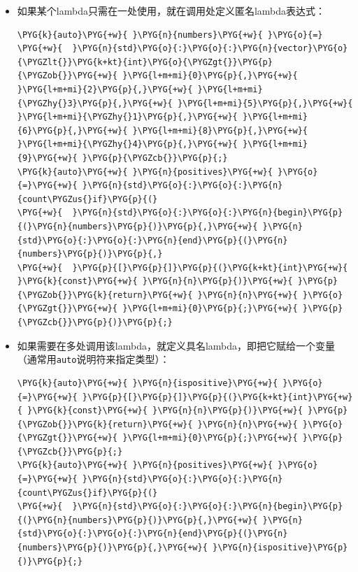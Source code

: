 \begin{itemize}
\item 如果某个lambda只需在一处使用，就在调用处定义匿名lambda表达式：



\begin{codeblockbg}
\begin{Verbatim}[commandchars=\\\{\},breaklines=true,breakanywhere=true,fontsize=\codefont,xleftmargin=17bp]
\PYG{k}{auto}\PYG{+w}{ }\PYG{n}{numbers}\PYG{+w}{ }\PYG{o}{=}
\PYG{+w}{  }\PYG{n}{std}\PYG{o}{:}\PYG{o}{:}\PYG{n}{vector}\PYG{o}{\PYGZlt{}}\PYG{k+kt}{int}\PYG{o}{\PYGZgt{}}\PYG{p}{\PYGZob{}}\PYG{+w}{ }\PYG{l+m+mi}{0}\PYG{p}{,}\PYG{+w}{ }\PYG{l+m+mi}{2}\PYG{p}{,}\PYG{+w}{ }\PYG{l+m+mi}{\PYGZhy{}3}\PYG{p}{,}\PYG{+w}{ }\PYG{l+m+mi}{5}\PYG{p}{,}\PYG{+w}{ }\PYG{l+m+mi}{\PYGZhy{}1}\PYG{p}{,}\PYG{+w}{ }\PYG{l+m+mi}{6}\PYG{p}{,}\PYG{+w}{ }\PYG{l+m+mi}{8}\PYG{p}{,}\PYG{+w}{ }\PYG{l+m+mi}{\PYGZhy{}4}\PYG{p}{,}\PYG{+w}{ }\PYG{l+m+mi}{9}\PYG{+w}{ }\PYG{p}{\PYGZcb{}}\PYG{p}{;}
\PYG{k}{auto}\PYG{+w}{ }\PYG{n}{positives}\PYG{+w}{ }\PYG{o}{=}\PYG{+w}{ }\PYG{n}{std}\PYG{o}{:}\PYG{o}{:}\PYG{n}{count\PYGZus{}if}\PYG{p}{(}
\PYG{+w}{  }\PYG{n}{std}\PYG{o}{:}\PYG{o}{:}\PYG{n}{begin}\PYG{p}{(}\PYG{n}{numbers}\PYG{p}{)}\PYG{p}{,}\PYG{+w}{ }\PYG{n}{std}\PYG{o}{:}\PYG{o}{:}\PYG{n}{end}\PYG{p}{(}\PYG{n}{numbers}\PYG{p}{)}\PYG{p}{,}
\PYG{+w}{  }\PYG{p}{[}\PYG{p}{]}\PYG{p}{(}\PYG{k+kt}{int}\PYG{+w}{ }\PYG{k}{const}\PYG{+w}{ }\PYG{n}{n}\PYG{p}{)}\PYG{+w}{ }\PYG{p}{\PYGZob{}}\PYG{k}{return}\PYG{+w}{ }\PYG{n}{n}\PYG{+w}{ }\PYG{o}{\PYGZgt{}}\PYG{+w}{ }\PYG{l+m+mi}{0}\PYG{p}{;}\PYG{+w}{ }\PYG{p}{\PYGZcb{}}\PYG{p}{)}\PYG{p}{;}
\end{Verbatim}
\end{codeblockbg}



\item 如果需要在多处调用该lambda，就定义具名lambda，即把它赋给一个变量（通常用\texttt{auto}说明符来指定类型）：



\begin{codeblockbg}
\begin{Verbatim}[commandchars=\\\{\},breaklines=true,breakanywhere=true,fontsize=\codefont,xleftmargin=17bp]
\PYG{k}{auto}\PYG{+w}{ }\PYG{n}{ispositive}\PYG{+w}{ }\PYG{o}{=}\PYG{+w}{ }\PYG{p}{[}\PYG{p}{]}\PYG{p}{(}\PYG{k+kt}{int}\PYG{+w}{ }\PYG{k}{const}\PYG{+w}{ }\PYG{n}{n}\PYG{p}{)}\PYG{+w}{ }\PYG{p}{\PYGZob{}}\PYG{k}{return}\PYG{+w}{ }\PYG{n}{n}\PYG{+w}{ }\PYG{o}{\PYGZgt{}}\PYG{+w}{ }\PYG{l+m+mi}{0}\PYG{p}{;}\PYG{+w}{ }\PYG{p}{\PYGZcb{}}\PYG{p}{;}
\PYG{k}{auto}\PYG{+w}{ }\PYG{n}{positives}\PYG{+w}{ }\PYG{o}{=}\PYG{+w}{ }\PYG{n}{std}\PYG{o}{:}\PYG{o}{:}\PYG{n}{count\PYGZus{}if}\PYG{p}{(}
\PYG{+w}{  }\PYG{n}{std}\PYG{o}{:}\PYG{o}{:}\PYG{n}{begin}\PYG{p}{(}\PYG{n}{numbers}\PYG{p}{)}\PYG{p}{,}\PYG{+w}{ }\PYG{n}{std}\PYG{o}{:}\PYG{o}{:}\PYG{n}{end}\PYG{p}{(}\PYG{n}{numbers}\PYG{p}{)}\PYG{p}{,}\PYG{+w}{ }\PYG{n}{ispositive}\PYG{p}{)}\PYG{p}{;}
\end{Verbatim}
\end{codeblockbg}



\end{itemize}
